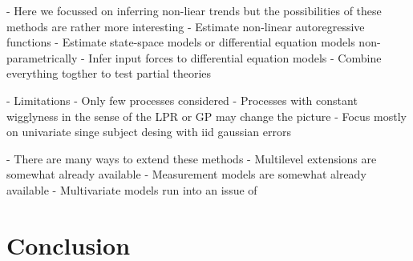 \documentclass[man, floatsintext]{apa7}
\begin{document}
- Here we focussed on inferring non-liear trends but the possibilities of
these methods are rather more interesting
- Estimate non-linear autoregressive functions
- Estimate state-space models or differential equation models
non-parametrically
- Infer input forces to differential equation models
- Combine everything togther to test partial theories

- Limitations
- Only few processes considered
- Processes with constant wigglyness in the sense of the LPR or GP may change
the picture
- Focus mostly on univariate singe subject desing with iid gaussian errors

- There are many ways to extend these methods
- Multilevel extensions are somewhat already available
- Measurement models are somewhat already available
- Multivariate models run into an issue of

\section{Conclusion}

\printbibliography[]
\end{document}
